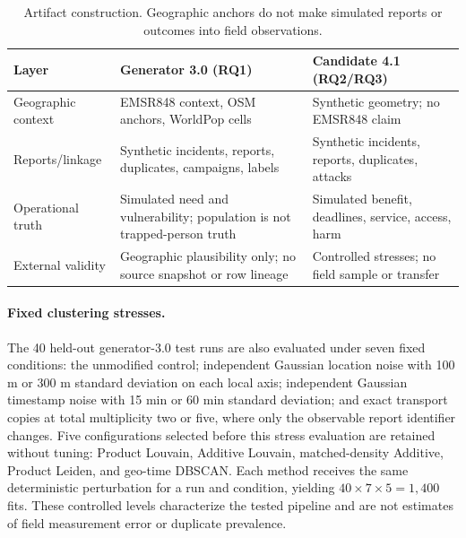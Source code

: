 \documentclass[runningheads]{llncs}
\begin{document}
\begin{table}[t]
\centering\footnotesize
\setlength{\tabcolsep}{3pt}
\caption{Artifact construction. Geographic anchors do not make simulated
reports or outcomes into field observations.}
\label{tab:data-realism}
\begin{tabular}{p{}p{}p{}}
\toprule
Layer & Generator 3.0 (RQ1) & Candidate 4.1 (RQ2/RQ3)\\
\midrule
Geographic context & EMSR848 context, OSM anchors, WorldPop cells
& Synthetic geometry; no EMSR848 claim\\
Reports/linkage & Synthetic incidents, reports, duplicates, campaigns, labels
& Synthetic incidents, reports, duplicates, attacks\\
Operational truth & Simulated need and vulnerability; population is not
trapped-person truth & Simulated benefit, deadlines, service, access, harm\\
External validity & Geographic plausibility only; no source snapshot or row
lineage & Controlled stresses; no field sample or transfer\\
\bottomrule
\end{tabular}
\end{table}

\paragraph{Fixed clustering stresses.}
The 40 held-out generator-3.0 test runs are also evaluated under seven fixed
conditions: the unmodified control; independent Gaussian location noise with
100 m or 300 m standard deviation on each local axis; independent Gaussian
timestamp noise with 15 min or 60 min standard deviation; and exact transport
copies at total multiplicity two or five, where only the observable report
identifier changes. Five configurations selected before this stress
evaluation are retained without tuning: Product Louvain, Additive Louvain,
matched-density Additive, Product Leiden, and geo-time DBSCAN. Each method
receives the same deterministic perturbation for a run and condition, yielding
$40\times7\times5=1{,}400$ fits. These controlled levels characterize the
tested pipeline and are not estimates of field measurement error or duplicate
prevalence.
\end{document}
